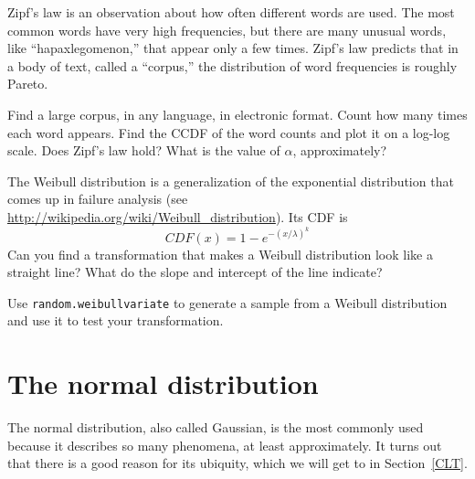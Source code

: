 \documentclass[12pt]{book}
\begin{document}
\begin{exercise}
Zipf's law is an observation about how often different words are used.
The most common words have very high frequencies, but there are many
unusual words, like ``hapaxlegomenon,'' that appear only a few times.
Zipf's law predicts that in a body of text, called a ``corpus,'' the
distribution of word frequencies is roughly Pareto.

Find a large corpus, in any language, in electronic
format.  Count how many times each word appears.  Find the CCDF of the
word counts and plot it on a log-log scale.  Does Zipf's law hold?
What is the value of $\alpha$, approximately?

\end{exercise}

\begin{exercise}
\label{weibull}

The Weibull distribution is a generalization of the exponential
distribution that comes up in failure analysis
(see \url{http://wikipedia.org/wiki/Weibull_distribution}).  Its CDF is
%
\[ CDF(x) = 1 - e^{-(x / \lambda)^k} \]
%
Can you find a transformation that makes a Weibull distribution look
like a straight line?  What do the slope and intercept of the
line indicate?

Use {\tt random.weibullvariate} to generate a sample from a
Weibull distribution and use it to test your transformation.

\end{exercise}


\section{The normal distribution}
\label{normal}

\newcommand{\erf}{\mathrm{erf}}

The normal distribution, also called Gaussian, is the most commonly
used because it describes so many phenomena, at least approximately.
It turns out that there is a good reason for its ubiquity, which we
will get to in Section~\ref{CLT}.
\end{document}
